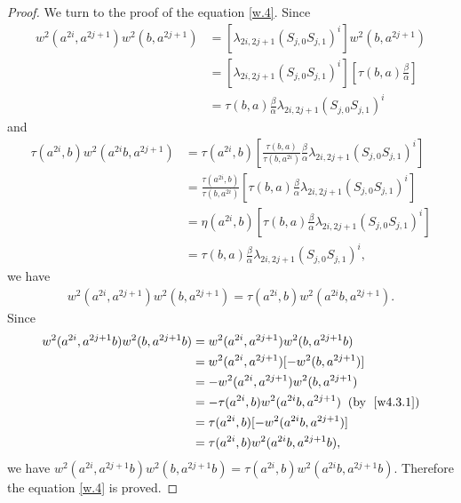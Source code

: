 \documentclass[a4paper,11pt]{amsart}
\numberwithin{equation}{section}
\begin{document}
\begin{proof}
We turn to the proof of the equation \eqref{w.4}. Since
\begin{align*}
w^2(a^{2i},a^{2j+1}) w^2(b,a^{2j+1})&=[\lambda_{2i,2j+1} (S_{j,0}S_{j,1})^i] w^2(b,a^{2j+1})\\
&=[\lambda_{2i,2j+1} (S_{j,0}S_{j,1})^i] [\tau(b,a)\frac{\beta}{\alpha}]\\
&=\tau(b,a) \frac{\beta}{\alpha} \lambda_{2i,2j+1} (S_{j,0}S_{j,1})^i
\end{align*}
and
\begin{align*}
\tau(a^{2i},b) w^2(a^{2i}b,a^{2j+1})&=\tau(a^{2i},b)[\frac{\tau(b,a)}{\tau(b,a^{2i})} \frac{\beta}{\alpha} \lambda_{2i,2j+1} (S_{j,0}S_{j,1})^i]\\
&=\frac{\tau(a^{2i},b)}{\tau(b,a^{2i})} [\tau(b,a) \frac{\beta}{\alpha} \lambda_{2i,2j+1} (S_{j,0}S_{j,1})^i]\\
&=\eta(a^{2i},b)[\tau(b,a) \frac{\beta}{\alpha} \lambda_{2i,2j+1} (S_{j,0}S_{j,1})^i]\\
&=\tau(b,a) \frac{\beta}{\alpha} \lambda_{2i,2j+1} (S_{j,0}S_{j,1})^i,
\end{align*}
we have
\begin{align}
\label{w4.3.1} w^2(a^{2i},a^{2j+1}) w^2(b,a^{2j+1})=\tau(a^{2i},b) w^2(a^{2i}b,a^{2j+1}).
\end{align}
Since
\begin{align*}
w^2(a^{2i},a^{2j+1}b) w^2(b,a^{2j+1}b)&=w^2(a^{2i},a^{2j+1}) w^2(b,a^{2j+1}b)\\
&=w^2(a^{2i},a^{2j+1}) [-w^2(b,a^{2j+1})]\\
&=-w^2(a^{2i},a^{2j+1}) w^2(b,a^{2j+1})\\
&=-\tau(a^{2i},b) w^2(a^{2i}b,a^{2j+1})\;\;(\text{by }\;\eqref{w4.3.1})\\
&=\tau(a^{2i},b) [-w^2(a^{2i}b,a^{2j+1})]\\
&=\tau(a^{2i},b) w^2(a^{2i}b,a^{2j+1}b),
\end{align*}
we have $w^2(a^{2i},a^{2j+1}b) w^2(b,a^{2j+1}b)=\tau(a^{2i},b) w^2(a^{2i}b,a^{2j+1}b)$. Therefore the equation \eqref{w.4} is proved.


\end{proof}
\end{document}
